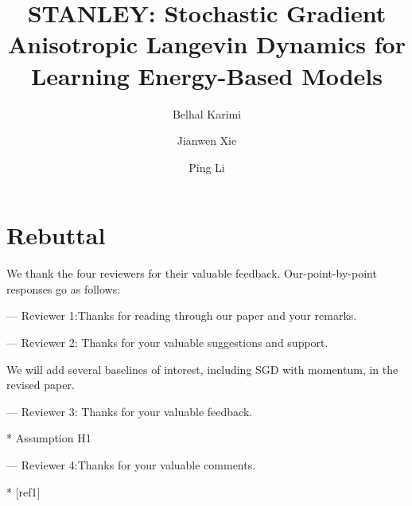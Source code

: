 \documentclass{article}
\title{STANLEY: Stochastic Gradient Anisotropic Langevin Dynamics for Learning Energy-Based Models}
\author{Belhal Karimi \and Jianwen Xie \and Ping Li}
\date{}
\begin{document}
\maketitle

\section{Rebuttal}

We thank the four reviewers for their valuable feedback. 
Our-point-by-point responses go as follows:


--- Reviewer 1:Thanks for reading through our paper and your remarks. 




--- Reviewer 2: Thanks for your valuable suggestions and support. 

We will add several baselines of interest, including SGD with momentum, in the revised paper. 

--- Reviewer 3: Thanks for your valuable feedback.

* Assumption H1


--- Reviewer 4:Thanks for your valuable comments.

* [ref1] 
\end{document}
